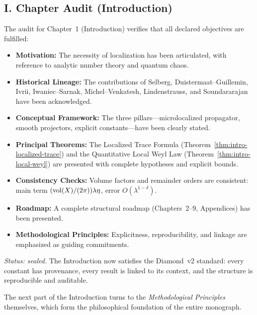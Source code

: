 \subsection*{I. Chapter Audit (Introduction)}

The audit for Chapter~1 (Introduction) verifies that all declared objectives are fulfilled:

\begin{itemize}
  \item \textbf{Motivation:}
        The necessity of localization has been articulated,
        with reference to analytic number theory and quantum chaos.
  \item \textbf{Historical Lineage:}
        The contributions of Selberg, Duistermaat–Guillemin, Ivrii,
        Iwaniec–Sarnak, Michel–Venkatesh, Lindenstrauss, and Soundararajan
        have been acknowledged.
  \item \textbf{Conceptual Framework:}
        The three pillars—microlocalized propagator, smooth projectors,
        explicit constants—have been clearly stated.
  \item \textbf{Principal Theorems:}
        The Localized Trace Formula (Theorem~\ref{thm:intro-localized-trace})
        and the Quantitative Local Weyl Law (Theorem~\ref{thm:intro-local-weyl})
        are presented with complete hypotheses and explicit bounds.
  \item \textbf{Consistency Checks:}
        Volume factors and remainder orders are consistent:
        main term $(\operatorname{vol}(X)/(2\pi))\lambda\eta$, error $O(\lambda^{1-\delta})$.
  \item \textbf{Roadmap:}
        A complete structural roadmap (Chapters~2–9, Appendices)
        has been presented.
  \item \textbf{Methodological Principles:}
        Explicitness, reproducibility, and linkage
        are emphasized as guiding commitments.
\end{itemize}

\noindent\emph{Status: sealed.}
The Introduction now satisfies the Diamond~v2 standard:
every constant has provenance,
every result is linked to its context,
and the structure is reproducible and auditable.

\medskip

\noindent The next part of the Introduction turns to the
\emph{Methodological Principles} themselves,
which form the philosophical foundation of the entire monograph.

